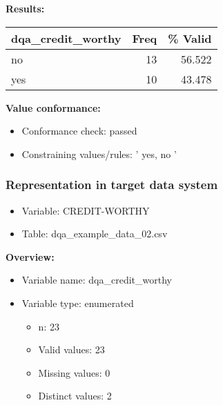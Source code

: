 \documentclass[
]{article}
\providecommand{\tightlist}{%
  \setlength{\itemsep}{0pt}\setlength{\parskip}{0pt}}
\begin{document}
\textbf{Results:}\\

\begin{table}[H]
\centering
\begin{tabular}{l|r|r}
\hline
\textbf{dqa\_credit\_worthy} & \textbf{Freq} & \textbf{\% Valid}\\
\hline
no & 13 & 56.522\\
\hline
yes & 10 & 43.478\\
\hline
\end{tabular}
\end{table}

\textbf{Value conformance:}

\begin{itemize}
\tightlist
\item
  Conformance check: passed
\item
  Constraining values/rules: ' yes, no '
\end{itemize}

\newpage

\hypertarget{representation-in-target-data-system-3}{%
\subsubsection{\texorpdfstring{Representation in \textbf{target} data
system}{Representation in target data system}}\label{representation-in-target-data-system-3}}

\begin{itemize}
\tightlist
\item
  Variable: CREDIT-WORTHY
\item
  Table: dqa\_example\_data\_02.csv
\end{itemize}

\textbf{Overview:}

\begin{itemize}
\tightlist
\item
  Variable name: dqa\_credit\_worthy
\item
  Variable type: enumerated

  \begin{itemize}
  \tightlist
  \item
    n: 23
  \item
    Valid values: 23
  \item
    Missing values: 0
  \item
    Distinct values: 2
  \end{itemize}
\end{itemize}
\end{document}
